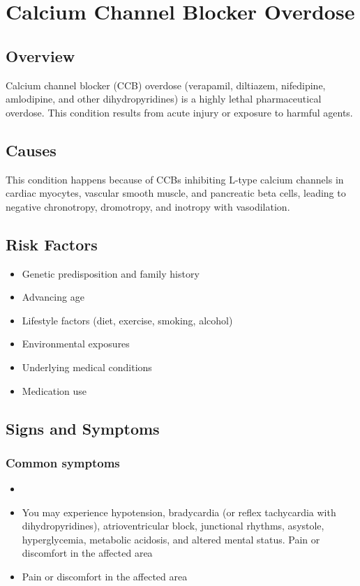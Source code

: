 \chapter{Calcium Channel Blocker Overdose}
\label{sec:CCB Overdose}

\section{Overview}
Calcium channel blocker (CCB) overdose (verapamil, diltiazem, nifedipine, amlodipine, and other dihydropyridines) is a highly lethal pharmaceutical overdose. This condition results from acute injury or exposure to harmful agents.
\section{Causes}
This condition happens because of CCBs inhibiting L-type calcium channels in cardiac myocytes, vascular smooth muscle, and pancreatic beta cells, leading to negative chronotropy, dromotropy, and inotropy with vasodilation.     
\section{Risk Factors}

\begin{itemize}[noitemsep]
  \item Genetic predisposition and family history
  \item Advancing age
  \item Lifestyle factors (diet, exercise, smoking, alcohol)
  \item Environmental exposures
  \item Underlying medical conditions
  \item Medication use
\end{itemize}
\section{Signs and Symptoms}

\subsection{Common symptoms}
\begin{itemize}[noitemsep]
  \item \item You may experience hypotension, bradycardia (or reflex tachycardia with dihydropyridines), atrioventricular block, junctional rhythms, asystole, hyperglycemia, metabolic acidosis, and altered mental status. Pain or discomfort in the affected area    \item Pain or discomfort in the affected area
  \end{itemize}

